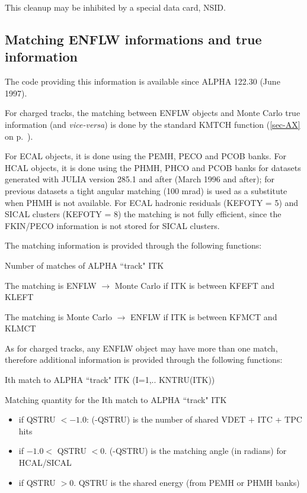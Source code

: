 This cleanup may be inhibited by a special data card, NSID. 



\subsection{\label{sec-EFLWMA}Matching ENFLW informations and true information}

The code providing this information is available since ALPHA 122.30 (June 1997).

For charged tracks, the matching between ENFLW objects and Monte Carlo true information
(and {\it vice-versa}) is done by the standard KMTCH function
(\ref{sec-AX} on p.~\pageref{sec-AX}).

For ECAL objects, it is done using the PEMH, PECO and PCOB banks.  
For HCAL objects, it is done using the PHMH, PHCO and PCOB banks for datasets generated with JULIA version 285.1 and after
(March 1996 and after); for previous datasets a tight angular matching (100 mrad) is used as a substitute when PHMH is not
available. For ECAL hadronic residuals (KEFOTY = 5) and SICAL clusters (KEFOTY = 8) the matching is not fully efficient, since
the FKIN/PECO information is not stored for SICAL clusters.


The matching information is provided through the following functions:

\begin{indentlist}{ 3.00cm}{ 3.25cm}
 Number of matches of ALPHA ``track" ITK                    

                         The matching is ENFLW $\rightarrow$ Monte Carlo if ITK is between KFEFT and KLEFT
  
                         The matching is Monte Carlo $\rightarrow$  ENFLW if ITK is between KFMCT and KLMCT
 
                         As for charged tracks, any ENFLW object may have more than one match, therefore  
                         additional information is provided through the following functions:

 Ith match to  ALPHA ``track" ITK (I=1,.. KNTRU(ITK))

 Matching quantity for the Ith match to  ALPHA ``track" ITK
\begin{itemize}
\item if QSTRU $<-1.0$:  (-QSTRU) is the number of shared VDET + ITC + TPC hits
\item if $-1.0 < $ QSTRU $<0.$ (-QSTRU) is the matching angle (in radians) 
                for HCAL/SICAL
\item if QSTRU $>0.$ QSTRU is the shared energy (from PEMH or PHMH banks)   
\end{itemize}

\end{indentlist}


